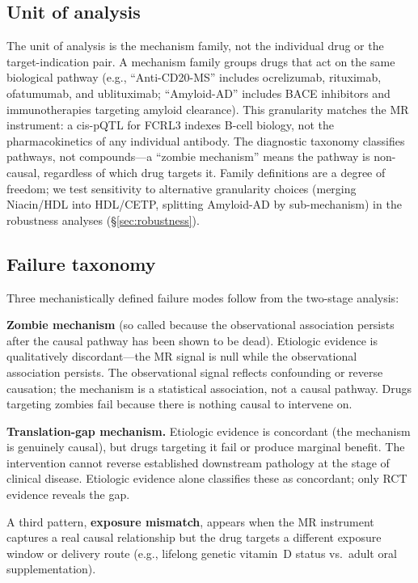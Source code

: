 \documentclass[11pt]{article}
\begin{document}
\subsection{Unit of analysis}

The unit of analysis is the mechanism family, not the individual drug or the target-indication pair. A mechanism family groups drugs that act on the same biological pathway (e.g., ``Anti-CD20-MS'' includes ocrelizumab, rituximab, ofatumumab, and ublituximab; ``Amyloid-AD'' includes BACE inhibitors and immunotherapies targeting amyloid clearance). This granularity matches the MR instrument: a cis-pQTL for FCRL3 indexes B-cell biology, not the pharmacokinetics of any individual antibody. The diagnostic taxonomy classifies pathways, not compounds---a ``zombie mechanism'' means the pathway is non-causal, regardless of which drug targets it. Family definitions are a degree of freedom; we test sensitivity to alternative granularity choices (merging Niacin/HDL into HDL/CETP, splitting Amyloid-AD by sub-mechanism) in the robustness analyses (\S\ref{sec:robustness}).

\subsection{Failure taxonomy}

Three mechanistically defined failure modes follow from the two-stage analysis:

\textbf{Zombie mechanism} (so called because the observational association persists after the causal pathway has been shown to be dead). Etiologic evidence is qualitatively discordant---the MR signal is null while the observational association persists. The observational signal reflects confounding or reverse causation; the mechanism is a statistical association, not a causal pathway. Drugs targeting zombies fail because there is nothing causal to intervene on.

\textbf{Translation-gap mechanism.} Etiologic evidence is concordant (the mechanism is genuinely causal), but drugs targeting it fail or produce marginal benefit. The intervention cannot reverse established downstream pathology at the stage of clinical disease. Etiologic evidence alone classifies these as concordant; only RCT evidence reveals the gap.

A third pattern, \textbf{exposure mismatch}, appears when the MR instrument captures a real causal relationship but the drug targets a different exposure window or delivery route (e.g., lifelong genetic vitamin~D status vs.\ adult oral supplementation).
\end{document}
